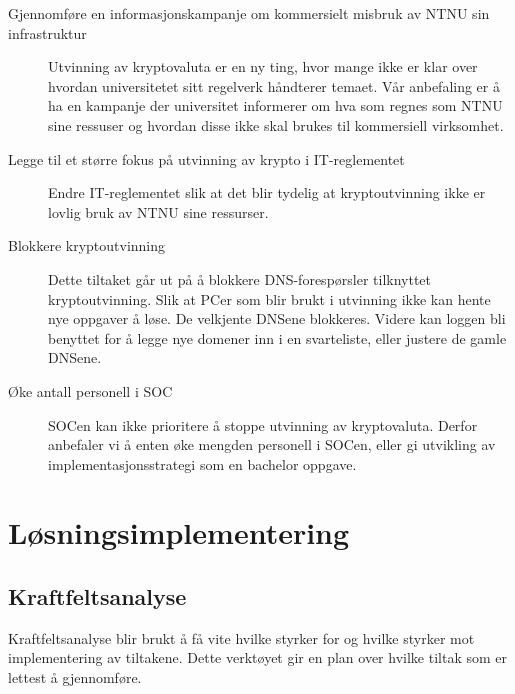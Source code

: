 \begin{description}
    \item[Gjennomføre en informasjonskampanje om kommersielt misbruk av NTNU sin infrastruktur] Utvinning av kryptovaluta er en ny ting, hvor mange ikke er klar over hvordan universitetet sitt regelverk håndterer temaet. Vår anbefaling er å ha en kampanje der universitet informerer om hva som regnes som NTNU sine ressuser og hvordan disse ikke skal brukes til kommersiell virksomhet.
    \item[Legge til et større fokus på utvinning av krypto i IT-reglementet] Endre IT-reglementet slik at det blir tydelig at kryptoutvinning ikke er lovlig bruk av NTNU sine ressurser. 
    \item[Blokkere kryptoutvinning] Dette tiltaket går ut på å blokkere DNS-forespørsler tilknyttet kryptoutvinning. Slik at PCer som blir brukt i utvinning ikke kan hente nye oppgaver å løse. De velkjente DNSene blokkeres. Videre kan loggen bli benyttet for å legge nye domener inn i en svarteliste, eller justere de gamle DNSene.
    \item[Øke antall personell i SOC] SOCen kan ikke prioritere å stoppe utvinning av kryptovaluta. Derfor anbefaler vi å enten øke mengden personell i SOCen, eller gi utvikling av implementasjonsstrategi som en bachelor oppgave.
\end{description}

\section{Løsningsimplementering}
\subsection{Kraftfeltsanalyse} 
Kraftfeltsanalyse blir brukt å få vite hvilke styrker for og hvilke styrker mot implementering av tiltakene. Dette verktøyet gir en plan over hvilke tiltak som er lettest å gjennomføre.  

